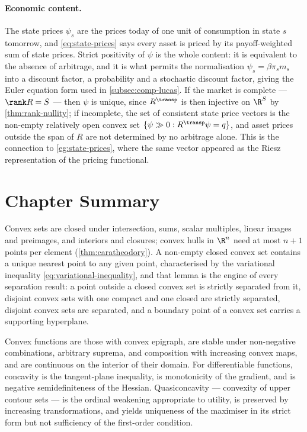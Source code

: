 \paragraph{Economic content.} The state prices $\psi_s$ are the prices today of
one unit of consumption in state $s$ tomorrow, and \eqref{eq:state-prices} says
every asset is priced by its payoff-weighted sum of state prices. Strict
positivity of $\psi$ is the whole content: it is equivalent to the absence of
arbitrage, and it is what permits the normalisation
$\psi_s=\beta\pi_sm_s$ into a discount factor, a probability and a stochastic
discount factor, giving the Euler equation form used in
\autoref{subsec:comp-lucas}. If the market is complete --- $\rank R=S$ --- then
$\psi$ is unique, since $R^{\transp}$ is then injective on $\R^S$ by
\autoref{thm:rank-nullity}; if incomplete, the set of consistent state price
vectors is the non-empty relatively open convex set
$\{\psi\gg0 : R^{\transp}\psi=q\}$, and asset prices outside the span of $R$ are
not determined by no arbitrage alone. This is the connection to
\autoref{eg:state-prices}, where the same vector appeared as the Riesz
representation of the pricing functional.

\section{Chapter Summary}\label{sec:cvx-summary}

Convex sets are closed under intersection, sums, scalar multiples, linear images
and preimages, and interiors and closures; convex hulls in $\R^n$ need at most
$n+1$ points per element (\autoref{thm:caratheodory}). A non-empty closed convex
set contains a unique nearest point to any given point, characterised by the
variational inequality \eqref{eq:variational-inequality}, and that lemma is the
engine of every separation result: a point outside a closed convex set is
strictly separated from it, disjoint convex sets with one compact and one closed
are strictly separated, disjoint convex sets are separated, and a boundary point
of a convex set carries a supporting hyperplane.

Convex functions are those with convex epigraph, are stable under non-negative
combinations, arbitrary suprema, and composition with increasing convex maps, and
are continuous on the interior of their domain. For differentiable functions,
concavity is the tangent-plane inequality, is monotonicity of the gradient, and
is negative semidefiniteness of the Hessian. Quasiconcavity --- convexity of
upper contour sets --- is the ordinal weakening appropriate to utility, is
preserved by increasing transformations, and yields uniqueness of the maximiser
in its strict form but not sufficiency of the first-order condition.

